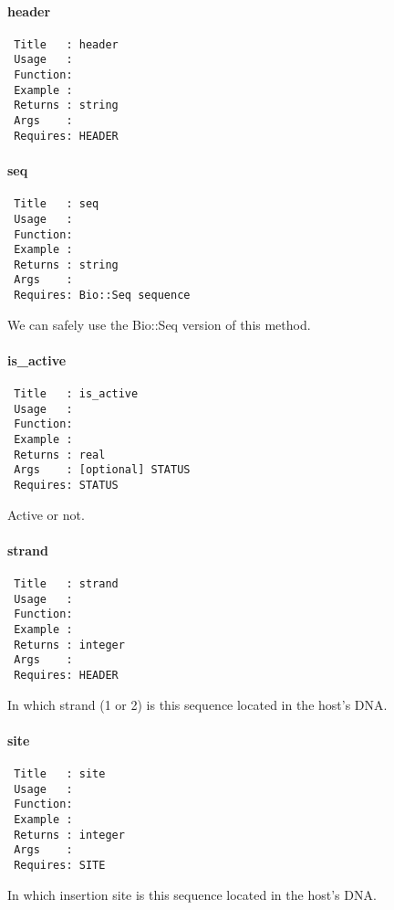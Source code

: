 \paragraph*{header\label{header}}
\begin{verbatim}
 Title   : header
 Usage   :
 Function: 
 Example :
 Returns : string
 Args    :
 Requires: HEADER
\end{verbatim}
\paragraph*{seq\label{seq}}
\begin{verbatim}
 Title   : seq
 Usage   :
 Function: 
 Example :
 Returns : string
 Args    :
 Requires: Bio::Seq sequence
\end{verbatim}


We can safely use the Bio::Seq version of this method.

\paragraph*{is\_active\label{is_active}}
\begin{verbatim}
 Title   : is_active
 Usage   :
 Function: 
 Example :
 Returns : real
 Args    : [optional] STATUS
 Requires: STATUS
\end{verbatim}


Active or not.

\paragraph*{strand\label{strand}}
\begin{verbatim}
 Title   : strand
 Usage   : 
 Function: 
 Example : 
 Returns : integer
 Args    : 
 Requires: HEADER
\end{verbatim}


In which strand (1 or 2) is this sequence located in the host's DNA.

\paragraph*{site\label{site}}
\begin{verbatim}
 Title   : site
 Usage   :
 Function: 
 Example :
 Returns : integer
 Args    :
 Requires: SITE
\end{verbatim}


In which insertion site is this sequence located in the host's DNA.

